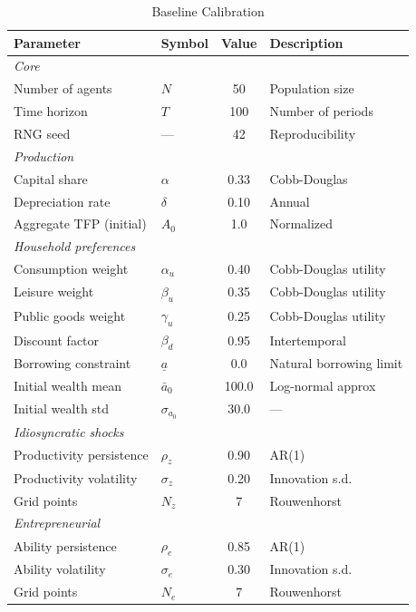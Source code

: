 \documentclass[12pt]{article}
\begin{document}
\begin{table}[tp]
\centering
\caption{Baseline Calibration}\label{tab:calibration}
\small
\begin{tabular}{@{}llcl@{}}
\toprule
\textbf{Parameter} & \textbf{Symbol} & \textbf{Value} & \textbf{Description} \\
\midrule
\multicolumn{4}{l}{\textit{Core}} \\
Number of agents & $N$ & 50 & Population size \\
Time horizon & $T$ & 100 & Number of periods \\
RNG seed & --- & 42 & Reproducibility \\
\midrule
\multicolumn{4}{l}{\textit{Production}} \\
Capital share & $\alpha$ & 0.33 & Cobb-Douglas \\
Depreciation rate & $\delta$ & 0.10 & Annual \\
Aggregate TFP (initial) & $A_0$ & 1.0 & Normalized \\
\midrule
\multicolumn{4}{l}{\textit{Household preferences}} \\
Consumption weight & $\alpha_u$ & 0.40 & Cobb-Douglas utility \\
Leisure weight & $\beta_u$ & 0.35 & Cobb-Douglas utility \\
Public goods weight & $\gamma_u$ & 0.25 & Cobb-Douglas utility \\
Discount factor & $\beta_d$ & 0.95 & Intertemporal \\
Borrowing constraint & $\underline{a}$ & 0.0 & Natural borrowing limit \\
Initial wealth mean & $\bar{a}_0$ & 100.0 & Log-normal approx \\
Initial wealth std & $\sigma_{a_0}$ & 30.0 & --- \\
\midrule
\multicolumn{4}{l}{\textit{Idiosyncratic shocks}} \\
Productivity persistence & $\rho_z$ & 0.90 & AR(1) \\
Productivity volatility & $\sigma_z$ & 0.20 & Innovation s.d. \\
Grid points & $N_z$ & 7 & Rouwenhorst \\
\midrule
\multicolumn{4}{l}{\textit{Entrepreneurial}} \\
Ability persistence & $\rho_e$ & 0.85 & AR(1) \\
Ability volatility & $\sigma_e$ & 0.30 & Innovation s.d. \\
Grid points & $N_e$ & 7 & Rouwenhorst \\

\end{tabular}
\end{table}
\end{document}
